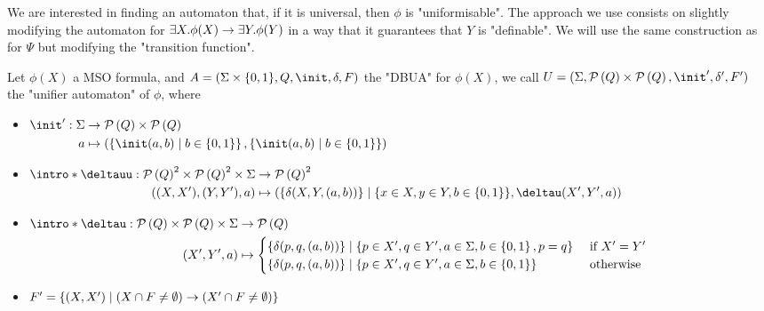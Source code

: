 \documentclass{article}
\begin{document}
We are interested in finding an automaton that, if it is universal, then $\phi$ is "uniformisable". The approach we use consists on slightly modifying
the automaton for $\exists X. \phi(X) \rightarrow \exists Y. \phi (Y)$ in a way that it guarantees that $Y$ is "definable". We will use the same construction as for $\Psi$ but modifying
the "transition function".

\begin{definition}
	Let $\phi(X)$ a MSO formula, and $A =  (\Sigma \times \{0,1\}, Q, \init, \delta, F)$ the "DBUA" for $\phi(X)$, we call $U = (\Sigma, \parts Q \times \parts Q,\init', \delta', F')$
	the "unifier automaton" of $\phi$, where
	\begin{itemize}
		\item$\begin{aligned}[t]
				      \init' : \Sigma & \to      \parts Q \times \parts {Q}                                                          \\
				      a               & \mapsto  ( \setdef{ \init(a,b) } {b \in \set{0,1}}, \setdef{ \init(a,b) } {b \in \set{0,1}})
			      \end{aligned}$
		\item$\begin{aligned}[t]
				      \intro*\deltauu : {\parts Q}^2 \times {\parts {Q}}^2 \times \Sigma & \to    {\parts {Q}}^2                                                                             \\
				      ((X,X'),(Y,Y'),a)                                                  & \mapsto (\{ \delta(X,Y,(a,b)) \}  \mid  \{x \in X, y \in Y, b \in \set{0,1}\}, \deltau (X',Y',a)) \\
			      \end{aligned}$
		\item $ \begin{aligned}[t]
				      \intro*\deltau : \parts Q \times \parts Q \times \Sigma & \to \parts Q                                                                                                              \\
				      (X', Y', a)                                             & \mapsto \begin{cases}
					                                                                        \{\delta(p,q,(a,b))\}     \mid \{p \in X', q \in Y', a \in \Sigma, b \in \set{0,1}, p = q\} & \text{ if } X' = Y' \\
					                                                                        \{\delta(p,q,(a,b))\}     \mid \{p \in X', q \in Y', a \in \Sigma, b \in \set{0,1} \}       & \text{ otherwise}
				                                                                        \end{cases}
			      \end{aligned}$
		\item $F' = \left\{(X,X') \mid (X \cap F \neq \emptyset) \rightarrow (X' \cap F \neq \emptyset)\right\}$
	\end{itemize}
\end{definition}
\end{document}
